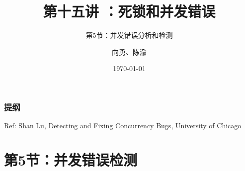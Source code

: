 


\title[第15讲]{第十五讲 ：死锁和并发错误} %
\subtitle{第5节：并发错误分析和检测}
\author{向勇、陈渝} %
\date{\today} %



\begin{frame}
\titlepage %
\end{frame}

\begin{frame}
\frametitle{提纲} %
\tableofcontents %

Ref: Shan Lu, Detecting and Fixing Concurrency Bugs, University of Chicago

\end{frame}
\section{第5节：并发错误检测} %

